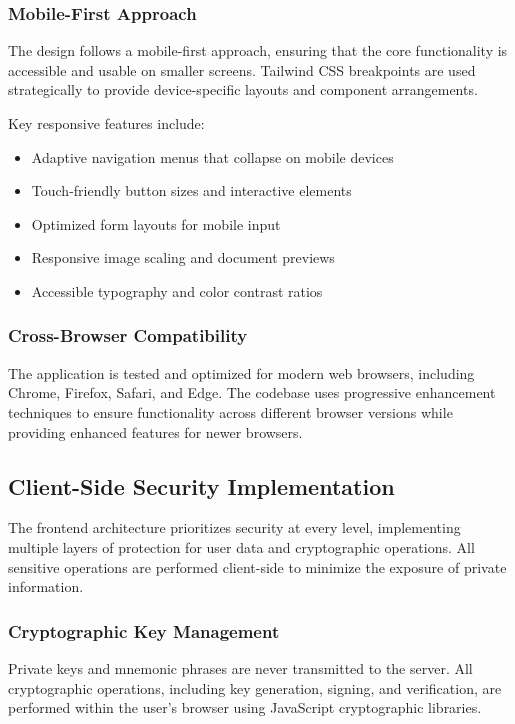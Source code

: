 \subsubsection{Mobile-First Approach}
The design follows a mobile-first approach, ensuring that the core functionality is accessible and usable on smaller screens. Tailwind CSS breakpoints are used strategically to provide device-specific layouts and component arrangements.

Key responsive features include:
\begin{itemize}
    \item Adaptive navigation menus that collapse on mobile devices
    \item Touch-friendly button sizes and interactive elements
    \item Optimized form layouts for mobile input
    \item Responsive image scaling and document previews
    \item Accessible typography and color contrast ratios
\end{itemize}

\subsubsection{Cross-Browser Compatibility}
The application is tested and optimized for modern web browsers, including Chrome, Firefox, Safari, and Edge. The codebase uses progressive enhancement techniques to ensure functionality across different browser versions while providing enhanced features for newer browsers.

\subsection{Client-Side Security Implementation}
The frontend architecture prioritizes security at every level, implementing multiple layers of protection for user data and cryptographic operations. All sensitive operations are performed client-side to minimize the exposure of private information.

\subsubsection{Cryptographic Key Management}
Private keys and mnemonic phrases are never transmitted to the server. All cryptographic operations, including key generation, signing, and verification, are performed within the user's browser using JavaScript cryptographic libraries.

